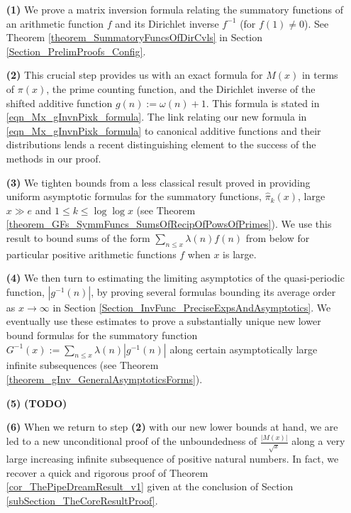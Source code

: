 \documentclass[11pt,reqno,a4letter]{article}
\numberwithin{figure}{section}
\numberwithin{table}{section}
\theoremstyle{plain}
\numberwithin{theorem}{section}
\theoremstyle{definition}
\begin{document}
\begin{itemize} 

\item[\textbf{(1)}] We prove a matrix inversion formula relating the summatory 
           functions of an arithmetic function $f$ and its Dirichlet inverse $f^{-1}$ (for $f(1) \neq 0$). 
           See Theorem \ref{theorem_SummatoryFuncsOfDirCvls} in 
           Section \ref{Section_PrelimProofs_Config}.  
\item[\textbf{(2)}] This crucial step provides us with an exact formula for $M(x)$ in terms of $\pi(x)$, the 
           prime counting function, and the 
           Dirichlet inverse of the shifted additive function $g(n) := \omega(n) + 1$. This 
           formula is stated in \eqref{eqn_Mx_gInvnPixk_formula}. 
           The link relating our new formula in 
           \eqref{eqn_Mx_gInvnPixk_formula} to canonical additive functions and their 
           distributions lends a recent distinguishing element to the 
           success of the methods in our proof. 
\item[\textbf{(3)}] We tighten bounds from a less classical result proved in 
            \cite[\S 7]{MV} providing uniform asymptotic formulas for the  
           summatory functions, $\widehat{\pi}_k(x)$, large $x \gg e$ and 
           $1 \leq k \leq \log\log x$ 
           (see Theorem \ref{theorem_GFs_SymmFuncs_SumsOfRecipOfPowsOfPrimes}). 
           We use this result to bound sums of the form 
           $\sum_{n \leq x} \lambda(n) f(n)$ from below for particular positive arithmetic 
           functions $f$ when $x$ is large. 
\item[\textbf{(4)}] We then turn to estimating the limiting 
           asymptotics of the quasi-periodic function, $|g^{-1}(n)|$, by proving several formulas bounding its 
           average order as $x \rightarrow \infty$ in 
           Section \ref{Section_InvFunc_PreciseExpsAndAsymptotics}. 
           We eventually use these estimates to prove a substantially unique new lower bound formulas 
           for the summatory function 
           $G^{-1}(x) := \sum_{n \leq x} \lambda(n) |g^{-1}(n)|$ 
           along certain asymptotically large 
           infinite subsequences (see Theorem \ref{theorem_gInv_GeneralAsymptoticsForms}). 
\item[\textbf{(5)}] \textbf{(TODO)} 
\item[\textbf{(6)}] When we return to step \textbf{(2)} 
           with our new lower bounds at hand, we are led to a new unconditional proof of the 
           unboundedness of $\frac{|M(x)|}{\sqrt{x}}$ 
           along a very large increasing infinite subsequence of positive natural numbers. 
           In fact, we recover a quick and rigorous proof of 
           Theorem \ref{cor_ThePipeDreamResult_v1} given at the conclusion of 
           Section \ref{subSection_TheCoreResultProof}. 
           
\end{itemize} 
\end{document}
